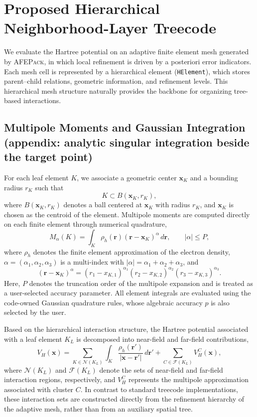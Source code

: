 \documentclass[a4paper,10pt]{article}
\begin{document}
\section{Proposed Hierarchical Neighborhood-Layer Treecode}

We evaluate the Hartree potential on an adaptive finite element mesh generated by
\textsc{AFEPack}, in which local refinement is driven by a posteriori error indicators.
Each mesh cell is represented by a hierarchical element (\texttt{HElement}),
which stores parent--child relations, geometric information, and refinement levels.
This hierarchical mesh structure naturally provides the backbone
for organizing tree-based interactions.
\subsection{Multipole Moments and Gaussian Integration \color{red}(appendix: analytic singular integration beside the target point)}

For each leaf element $K$,
we associate a geometric center $\mathbf x_K$
and a bounding radius $r_K$
such that
\[
K \subset B(\mathbf x_K,r_K),
\]
where $B(\mathbf x_K,r_K)$ denotes
a ball centered at $\mathbf x_K$
with radius $r_K$,
and $\mathbf x_K$
is chosen as the centroid of the element.
Multipole moments are computed directly
on each finite element through numerical quadrature,
\begin{equation}\label{eq:multipole_moments}
M_{\alpha}(K)
=
\int_K
\rho_h(\mathbf r)
(\mathbf r-\mathbf x_K)^\alpha
\, d\mathbf r,
\qquad |\alpha|\le P,
\end{equation}
where $\rho_h$
denotes the finite element approximation
of the electron density,
$\alpha=(\alpha_1,\alpha_2,\alpha_3)$
is a multi-index with
$|\alpha|=\alpha_1+\alpha_2+\alpha_3$,
and
\[
(\mathbf r-\mathbf x_K)^\alpha
=
(r_1-x_{K,1})^{\alpha_1}
(r_2-x_{K,2})^{\alpha_2}
(r_3-x_{K,3})^{\alpha_3}.
\]
Here,
$P$ denotes the truncation order
of the multipole expansion and is treated as a user-selected
accuracy parameter.
All element integrals are evaluated
using the code-owned Gaussian quadrature rules, whose algebraic
accuracy \(p\) is also selected by the user.

Based on the hierarchical interaction structure,
the Hartree potential associated with a leaf element $K_L$
is decomposed into near-field and far-field contributions,
\begin{equation}
V_H(\mathbf x)
=
\sum_{K \in \mathcal N(K_L)}
\int_K
\frac{\rho_h(\mathbf r')}
{|\mathbf x-\mathbf r'|}
\, d\mathbf r'
+
\sum_{C \in \mathcal F(K_L)}
V_H^C(\mathbf x),
\end{equation}
where $\mathcal N(K_L)$
and $\mathcal F(K_L)$
denote the sets of near-field
and far-field interaction regions, respectively,
and $V_H^C$
represents the multipole approximation
associated with cluster $C$.
In contrast to standard treecode implementations,
these interaction sets are constructed directly
from the refinement hierarchy
of the adaptive mesh,
rather than from an auxiliary spatial tree.
\end{document}
